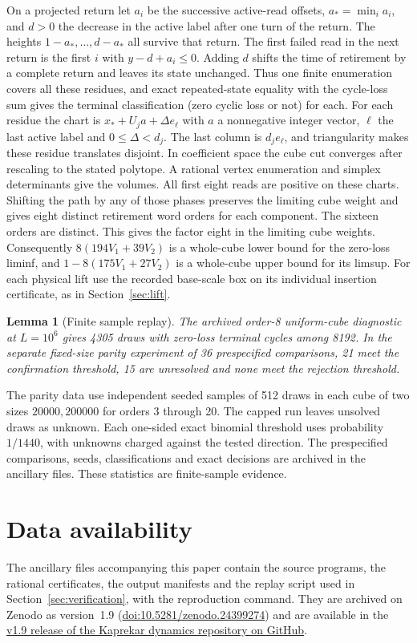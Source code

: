 \documentclass[11pt,reqno]{amsart}
\newtheorem{lemma}[theorem]{Lemma}
\theoremstyle{remark}
\begin{document}
On a projected return let \(a_i\) be the successive active-read
offsets, \(a_*=\min_i a_i\), and \(d>0\) the decrease in the
active label after one turn of the return. The heights
\(1-a_*,\ldots,d-a_*\) all survive that return.
The first failed read in the next return is the first
\(i\) with \(y-d+a_i\le0\). Adding \(d\) shifts the time of
retirement by a complete return and leaves its state unchanged.
Thus one finite enumeration covers all these residues,
and exact repeated-state equality with the cycle-loss sum gives
the terminal classification (zero cyclic loss or not) for each. For each residue the chart is
\(x_*+U_j a+\Delta e_\ell\) with \(a\) a nonnegative integer vector,
\(\ell\) the last active label and \(0\le\Delta<d_j\).
The last column is \(d_j e_\ell\), and triangularity makes these
residue translates disjoint. In coefficient space the cube cut
converges after rescaling to the stated polytope. A rational vertex
enumeration and simplex determinants give the volumes.
All first eight reads are positive on these charts.
Shifting the path by any of those phases preserves the limiting
cube weight and gives eight distinct retirement word orders for
each component. The sixteen orders are distinct. This gives the
factor eight in the limiting cube weights. Consequently
\(8(194V_1+39V_2)\) is a whole-cube lower bound for the zero-loss
liminf, and \(1-8(175V_1+27V_2)\) is a whole-cube upper bound
for its limsup. For each physical lift
use the recorded base-scale box on its individual insertion
certificate, as in Section~\ref{sec:lift}.

\begin{lemma}[Finite sample replay]\label{lem:compsample}
The archived order-8 uniform-cube diagnostic at \(L=10^6\) gives
4305 draws with zero-loss terminal cycles among 8192.
In the separate fixed-size parity experiment of 36 prespecified
comparisons, 21 meet the confirmation threshold, 15
are unresolved and none meet the rejection threshold.
\end{lemma}

The parity data use independent seeded samples of 512 draws in
each cube of two sizes \(20000,200000\) for orders 3 through 20.
The capped run leaves unsolved draws as unknown. Each one-sided
exact binomial threshold uses probability \(1/1440\), with
unknowns charged against the tested direction. The prespecified
comparisons, seeds, classifications and exact decisions are archived in the
ancillary files. These statistics are finite-sample evidence.

\clearpage
\section*{Data availability}
The ancillary files accompanying this paper contain the source programs,
the rational certificates, the output manifests and the replay script used
in Section~\ref{sec:verification}, with the reproduction command. They are
archived on Zenodo as version~1.9
(\href{https://doi.org/10.5281/zenodo.24399274}{doi:10.5281/zenodo.24399274}) and are available in the
\href{https://github.com/galyavin/kaprekar-dynamics/releases/tag/v1.9}{v1.9 release of the Kaprekar dynamics repository on GitHub}.
\end{document}
